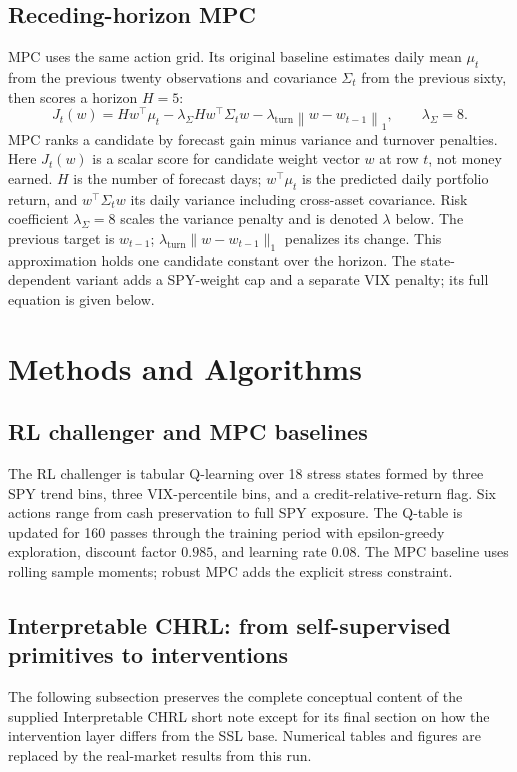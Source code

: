 \documentclass[11pt,a4paper]{article}
\begin{document}
\subsection{Receding-horizon MPC}
MPC uses the same action grid. Its original baseline estimates daily mean $\mu_t$ from the previous twenty observations and covariance $\Sigma_t$ from the previous sixty, then scores a horizon $H=5$:
\begin{equation}
J_t(w) = H w^\top\mu_t - \lambda_{\Sigma}H w^\top\Sigma_t w - \lambda_{\mathrm{turn}}\left\|w-w_{t-1}\right\|_1,
\qquad \lambda_{\Sigma}=8.
\label{eq:mpc-objective}
\end{equation}
MPC ranks a candidate by forecast gain minus variance and turnover penalties.
Here $J_t(w)$ is a scalar score for candidate weight vector $w$ at row $t$, not money earned. $H$ is the number of forecast days; $w^\top\mu_t$ is the predicted daily portfolio return, and $w^\top\Sigma_t w$ its daily variance including cross-asset covariance. Risk coefficient $\lambda_\Sigma=8$ scales the variance penalty and is denoted $\lambda$ below. The previous target is $w_{t-1}$; $\lambda_{\mathrm{turn}}\|w-w_{t-1}\|_1$ penalizes its change. This approximation holds one candidate constant over the horizon. The state-dependent variant adds a SPY-weight cap and a separate VIX penalty; its full equation is given below.

\section{Methods and Algorithms}
\subsection{RL challenger and MPC baselines}
The RL challenger is tabular Q-learning over 18 stress states formed by three SPY trend bins, three VIX-percentile bins, and a credit-relative-return flag. Six actions range from cash preservation to full SPY exposure. The Q-table is updated for 160 passes through the training period with epsilon-greedy exploration, discount factor $0.985$, and learning rate $0.08$. The MPC baseline uses rolling sample moments; robust MPC adds the explicit stress constraint.



\subsection{Interpretable CHRL: from self-supervised primitives to interventions}
\label{sec:chrl}
The following subsection preserves the complete conceptual content of the supplied Interpretable CHRL short note except for its final section on how the intervention layer differs from the SSL base. Numerical tables and figures are replaced by the real-market results from this run.
\end{document}
